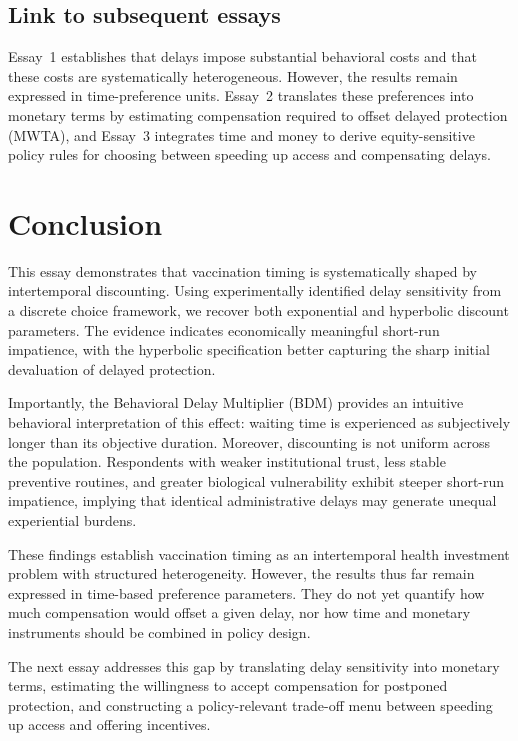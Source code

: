\documentclass[doublespacing]{utdthesis}
\begin{document}
\subsection*{Link to subsequent essays}
Essay~1 establishes that delays impose substantial behavioral costs and that these costs are systematically heterogeneous. However, the results remain expressed in time-preference units. Essay~2 translates these preferences into monetary terms by estimating compensation required to offset delayed protection (MWTA), and Essay~3 integrates time and money to derive equity-sensitive policy rules for choosing between speeding up access and compensating delays.




\section{Conclusion}
\label{sec:essay1_conclusion}

This essay demonstrates that vaccination timing is systematically shaped by intertemporal discounting. Using experimentally identified delay sensitivity from a discrete choice framework, we recover both exponential and hyperbolic discount parameters. The evidence indicates economically meaningful short-run impatience, with the hyperbolic specification better capturing the sharp initial devaluation of delayed protection.

Importantly, the Behavioral Delay Multiplier (BDM) provides an intuitive behavioral interpretation of this effect: waiting time is experienced as subjectively longer than its objective duration. Moreover, discounting is not uniform across the population. Respondents with weaker institutional trust, less stable preventive routines, and greater biological vulnerability exhibit steeper short-run impatience, implying that identical administrative delays may generate unequal experiential burdens.

These findings establish vaccination timing as an intertemporal health investment problem with structured heterogeneity. However, the results thus far remain expressed in time-based preference parameters. They do not yet quantify how much compensation would offset a given delay, nor how time and monetary instruments should be combined in policy design.

The next essay addresses this gap by translating delay sensitivity into monetary terms, estimating the willingness to accept compensation for postponed protection, and constructing a policy-relevant trade-off menu between speeding up access and offering incentives.
\end{document}
